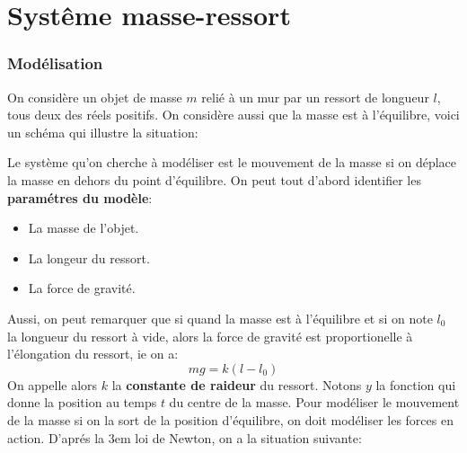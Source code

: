\chapter{Systême masse-ressort}
   \subsection{Modélisation}
      On considère un objet de masse \(m\) relié à un mur par un ressort de longueur \(l\), tous deux des réels positifs. On considère aussi que la masse est à l'équilibre, voici un schéma qui illustre la situation:
      \begin{center}
      \end{center}
   Le système qu'on cherche à modéliser est le mouvement de la masse si on déplace la masse en dehors du point d'équilibre. On peut tout d'abord identifier les \textbf{paramétres du modèle}:
   \begin{itemize}
      \item La masse de l'objet.
      \item La longeur du ressort.
      \item La force de gravité.
   \end{itemize}
   Aussi, on peut remarquer que si quand la masse est à l'équilibre et si on note \(l_0\) la longueur du ressort à vide, alors la force de gravité est proportionelle à l'élongation du ressort, ie on a:
   \[
      mg = k(l - l_0)
   \]
   On appelle alors \(k\) la \textbf{constante de raideur} du ressort. Notons \(y\) la fonction qui donne la position au temps \(t\) du centre de la masse. Pour modéliser le mouvement de la masse si on la sort de la position d'équilibre, on doit modéliser les forces en action.  D'aprés la 3em loi de Newton, on a la situation suivante:
